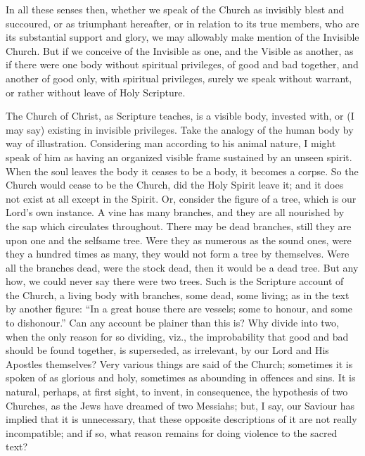 In all these senses then, whether we speak of the Church as
invisibly blest and succoured, or as triumphant hereafter, or in
relation to its true members, who are its substantial support and
glory, we may allowably make mention of the Invisible Church. But if
we conceive of the Invisible as one, and the Visible as another, as if
there were one body without spiritual privileges, of good and bad
together, and another of good only, with spiritual privileges, surely
we speak without warrant, or rather without leave of Holy Scripture.

The Church of Christ, as Scripture teaches, is a visible body,
invested with, or (I may say) existing in invisible privileges. Take
the analogy of the human body by way of illustration. Considering man
according to his animal nature, I might speak of him as having an
organized visible frame sustained by an unseen spirit. When the soul
leaves the body it ceases to be a body, it becomes a corpse. So the
Church would cease to be the Church, did the Holy Spirit leave it; and
it does not exist at all except in the Spirit. Or, consider the figure
of a tree, which is our Lord's own instance. A vine has many branches,
and they are all nourished by the sap which circulates throughout.
There may be dead branches, still they are upon one and the selfsame
tree. Were they as numerous as the sound ones, were they a hundred
times as many, they would not form a tree by themselves. Were all the
branches dead, were the stock dead, then it would be a dead tree. But
any how, we could never say there were two trees. Such is the
Scripture account of the Church, a living body with branches, some
dead, some living; as in the text by another figure: ``In a great
house there are vessels; some to honour, and some to dishonour.''
Can any account be plainer than this is? Why divide into two, when the
only reason for so dividing, viz., the improbability that good and bad
should be found together, is superseded, as irrelevant, by our Lord and His
Apostles themselves? Very various things are said of the Church;
sometimes it is spoken of as glorious and holy, sometimes as abounding
in offences and sins. It is natural, perhaps, at first sight, to
invent, in consequence, the hypothesis of two Churches, as the Jews
have dreamed of two Messiahs; but, I say, our Saviour has implied that
it is unnecessary, that these opposite descriptions of it are not
really incompatible; and if so, what reason remains for doing violence
to the sacred text?

